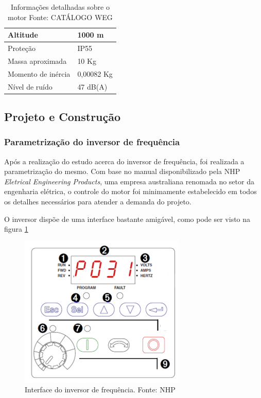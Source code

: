 \begin{table}[h]
\begin{center}
\begin{tabular}{|p{5cm}|p{5cm}|}
                Altitude & 1000 m
                \\ \hline
                Proteção & IP55
                \\ \hline
                Massa aproximada & 10 Kg
                \\ \hline
                Momento de inércia & 0,00082 Kg
                \\ \hline
                Nível de ruído & 47 dB(A)
                \\ \hline
              \end{tabular}
              \caption[Informações detalhadas sobre o motor]{Informações detalhadas sobre o motor
              \protect Fonte: CATÁLOGO WEG }
            \label{tabela_info_motor}
        \end{center}
    \end{table}

\subsection{Projeto e Construção}

\subsubsection*{Parametrização do inversor de frequência}

Após a realização do estudo acerca do inversor de frequência, foi realizada a parametrização do mesmo. Com base no manual disponibilizado pela NHP \textit{Eletrical Engineering Products}, uma empresa australiana renomada no setor da engenharia elétrica, o controle do motor foi minimamente estabelecido em todos os detalhes necessários para atender a demanda do projeto.

O inversor dispõe de uma interface bastante amigável, como pode ser visto na figura \ref{Interface do inversor}

\begin{figure}[h!]
	\centering
		\includegraphics[keepaspectratio=true,scale=0.6]{figuras/interface_inversor.png}
	\caption{Interface do inversor de frequência. Fonte: NHP}
    \label{Interface do inversor}
\end{figure}

